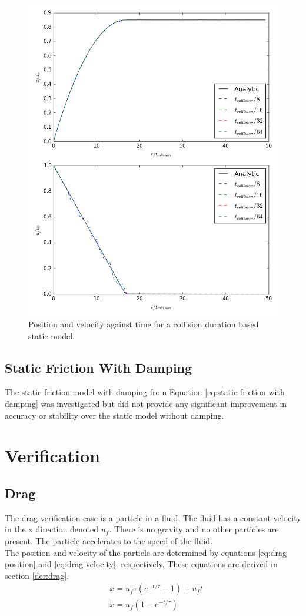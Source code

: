 \documentclass[10pt,a4paper,titlepage]{report}
\begin{document}
\begin{figure}[!ht]
\centering
\includegraphics[scale=0.5]{figures/friction_model/t_col_static.png}
\caption{Position and velocity against time for a collision duration based static model.}
\label{fig:t_col_static}
\end{figure}
\subsection{Static Friction With Damping}
The static friction model with damping from Equation \ref{eq:static friction with damping} was investigated but did not provide any significant improvement in accuracy or stability over the static model without damping.
\section{Verification}
\label{sec:verification}
\subsection{Drag}
The drag verification case is a particle in a fluid. The fluid has a constant velocity in the x direction denoted $u_f$. There is no gravity and no other particles are present. The particle accelerates to the speed of the fluid.
\\The position and velocity of the particle are determined by equations \ref{eq:drag position} and \ref{eq:drag velocity}, respectively. These equations are derived in section \ref{der:drag}.
\begin{align}
&x = u_f \tau (e^{-t/\tau} - 1) + u_f t \label{eq:drag position} \\
&\dot{x} = u_f (1 - e^{-t/\tau}) \label{eq:drag velocity} \\
\end{align}
\end{document}
